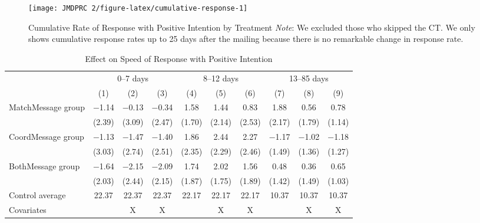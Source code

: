 \documentclass[12pt, a4paper]{article}
\begin{document}
\begin{figure}[H]
\texttt{[image: JMDPRC~2/figure-latex/cumulative-response-1]} \caption{Cumulative Rate of Response with Positive Intention by Treatment \newline \emph{Note}: We excluded those who skipped the CT. We only shows cumulative response rates up to 25 days after the mailing because there is no remarkable change in response rate.}\label{fig:cumulative-response}
\end{figure}

\clearpage

\begin{table}[H]

\caption{\label{tab:lm-positive-time-decompose}Effect on Speed of Response with Positive Intention}
\centering
\fontsize{8}{10}\selectfont
\begin{threeparttable}
\begin{tabular}[t]{>{\raggedright\arraybackslash}p{20em}ccccccccc}
\toprule
\multicolumn{1}{c}{ } & \multicolumn{3}{c}{0--7 days} & \multicolumn{3}{c}{8--12 days} & \multicolumn{3}{c}{13--85 days} \\
\cmidrule(l{3pt}r{3pt}){2-4} \cmidrule(l{3pt}r{3pt}){5-7} \cmidrule(l{3pt}r{3pt}){8-10}
  & (1) & (2) & (3) & (4) & (5) & (6) & (7) & (8) & (9)\\
\midrule
MatchMessage group & \num{-1.14} & \num{-0.13} & \num{-0.34} & \num{1.58} & \num{1.44} & \num{0.83} & \num{1.88} & \num{0.56} & \num{0.78}\\
 & (\num{2.39}) & (\num{3.09}) & (\num{2.47}) & (\num{1.70}) & (\num{2.14}) & (\num{2.53}) & (\num{2.17}) & (\num{1.79}) & (\num{1.14})\\
CoordMessage group & \num{-1.13} & \num{-1.47} & \num{-1.40} & \num{1.86} & \num{2.44} & \num{2.27} & \num{-1.17} & \num{-1.02} & \num{-1.18}\\
 & (\num{3.03}) & (\num{2.74}) & (\num{2.51}) & (\num{2.35}) & (\num{2.29}) & (\num{2.46}) & (\num{1.49}) & (\num{1.36}) & (\num{1.27})\\
BothMessage group & \num{-1.64} & \num{-2.15} & \num{-2.09} & \num{1.74} & \num{2.02} & \num{1.56} & \num{0.48} & \num{0.36} & \num{0.65}\\
 & (\num{2.03}) & (\num{2.44}) & (\num{2.15}) & (\num{1.87}) & (\num{1.75}) & (\num{1.89}) & (\num{1.42}) & (\num{1.49}) & (\num{1.03})\\
\midrule
Control average & 22.37 & 22.37 & 22.37 & 22.17 & 22.17 & 22.17 & 10.37 & 10.37 & 10.37\\
Covariates &  & X & X &  & X & X &  & X & X\\

\end{tabular}
\end{threeparttable}
\end{table}
\end{document}
